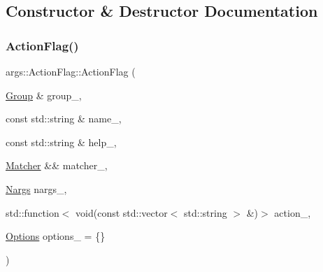 \subsection{Constructor \& Destructor Documentation}
\mbox{\label{classargs_1_1_action_flag_aa0f44a64b894b5cfe2410c9df7addd9d}} 
\subsubsection{\texorpdfstring{Action\+Flag()}{ActionFlag()}\hspace{0.1cm}{\footnotesize\ttfamily [1/3]}}
{\footnotesize\ttfamily args\+::\+Action\+Flag\+::\+Action\+Flag (\begin{DoxyParamCaption}\item[{\hyperlink{classargs_1_1_group}{Group} \&}]{group\+\_\+,  }\item[{const std\+::string \&}]{name\+\_\+,  }\item[{const std\+::string \&}]{help\+\_\+,  }\item[{\hyperlink{classargs_1_1_matcher}{Matcher} \&\&}]{matcher\+\_\+,  }\item[{\hyperlink{structargs_1_1_nargs}{Nargs}}]{nargs\+\_\+,  }\item[{std\+::function$<$ void(const std\+::vector$<$ std\+::string $>$ \&)$>$}]{action\+\_\+,  }\item[{\hyperlink{namespaceargs_aa530c0f95194aa275f49a5f299ac9e77}{Options}}]{options\+\_\+ = {\ttfamily \{\}} }\end{DoxyParamCaption})\hspace{0.3cm}{\ttfamily [inline]}}

\mbox{\label{classargs_1_1_action_flag_a0f5aa72ff82d751962e764e4b71bdff6}} 
